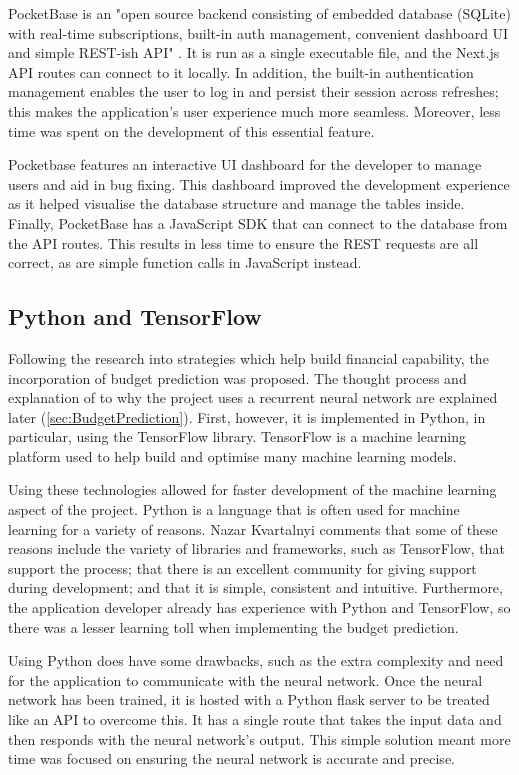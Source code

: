 PocketBase is an "open source backend consisting of embedded database (SQLite) with real-time subscriptions, built-in auth management, convenient dashboard UI and simple REST-ish API" \cite{PocketBaseDocs}. It is run as a single executable file, and the Next.js API routes can connect to it locally. In addition, the built-in authentication management enables the user to log in and persist their session across refreshes; this makes the application's user experience much more seamless. Moreover, less time was spent on the development of this essential feature.

Pocketbase features an interactive UI dashboard for the developer to manage users and aid in bug fixing. This dashboard improved the development experience as it helped visualise the database structure and manage the tables inside. Finally, PocketBase has a JavaScript SDK that can connect to the database from the API routes. This results in less time to ensure the REST requests are all correct, as are simple function calls in JavaScript instead.

\subsection{Python and TensorFlow}
Following the research into strategies which help build financial capability, the incorporation of budget prediction was proposed. The thought process and explanation of to why the project uses a recurrent neural network are explained later (\ref{sec:BudgetPrediction}). First, however, it is implemented in Python, in particular, using the TensorFlow library. TensorFlow is a machine learning platform used to help build and optimise many machine learning models. 

Using these technologies allowed for faster development of the machine learning aspect of the project. Python is a language that is often used for machine learning for a variety of reasons. Nazar Kvartalnyi \cite{PythonML} comments that some of these reasons include the variety of libraries and frameworks, such as TensorFlow, that support the process; that there is an excellent community for giving support during development; and that it is simple, consistent and intuitive. Furthermore, the application developer already has experience with Python and TensorFlow, so there was a lesser learning toll when implementing the budget prediction.

Using Python does have some drawbacks, such as the extra complexity and need for the application to communicate with the neural network. Once the neural network has been trained, it is hosted with a Python flask server to be treated like an API to overcome this. It has a single route that takes the input data and then responds with the neural network's output. This simple solution meant more time was focused on ensuring the neural network is accurate and precise.

